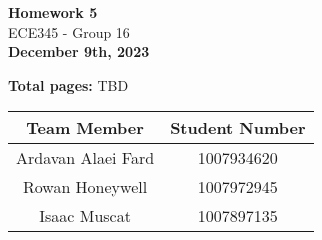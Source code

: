 \begin{titlepage}
    \begin{center}
    {\fontsize{40}{48}\selectfont \bfseries Homework 5} 
    \\\vspace{20pt}
    {\LARGE ECE345 - Group 16} \\
    \vspace{20pt}
    \textbf{December 9th, 2023}
    \vspace{8pt}

    \textbf{Total pages:} TBD
    \end{center}

    \begin{table}[!ht]
        \centering
        \begin{tabular}{|c|c|}
        \hline
            \textbf{Team Member} & \textbf{Student Number} \\ \hline
            Ardavan Alaei Fard & 1007934620 \\ \hline
            Rowan Honeywell & 1007972945 \\ \hline
            Isaac Muscat & 1007897135 \\ \hline
        \end{tabular}
    \end{table}
\end{titlepage}